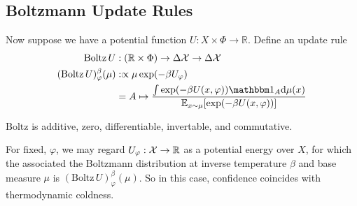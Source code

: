 \documentclass{article}
\begin{document}
\subsection{Boltzmann Update Rules}
% 
% 
Now suppose we have a potential function $U : X \times \Phi  \to \mathbb R$.
Define an update rule
\begin{align*}
    \mathrm{Boltz}\,U &: (\mathbb R \times \Phi) \to \Delta\X \to \Delta\X \\
    (\mathrm{Boltz}\,U)^\beta_\varphi(\mu) 
        &:\propto
            \mu \exp(-\beta U_\varphi) \\
        &= A \mapsto \frac
            {\int \exp(-\beta U(x,\varphi)) \mathbbm 1_A \mathrm d\mu(x) }
            {\Ex_{x\sim\mu} [ \exp(-\beta U(x,\varphi))]}
\end{align*}

\begin{prop}
    $\mathrm{Boltz}$ is additive, zero, differentiable, invertable, and commutative. 
\end{prop}


\begin{remark}
    For fixed, $\varphi$,
    we may regard $U_\varphi : \mathcal X \to \mathbb R$ as a potential energy over $X$, 
    for which the associated the Boltzmann distribution at inverse temperature $\beta$ and base measure $\mu$ is $(\mathrm{Boltz}\,U)^\beta_\varphi(\mu)$.
    So in this case, confidence coincides with thermodynamic coldness.
\end{remark}
\end{document}
